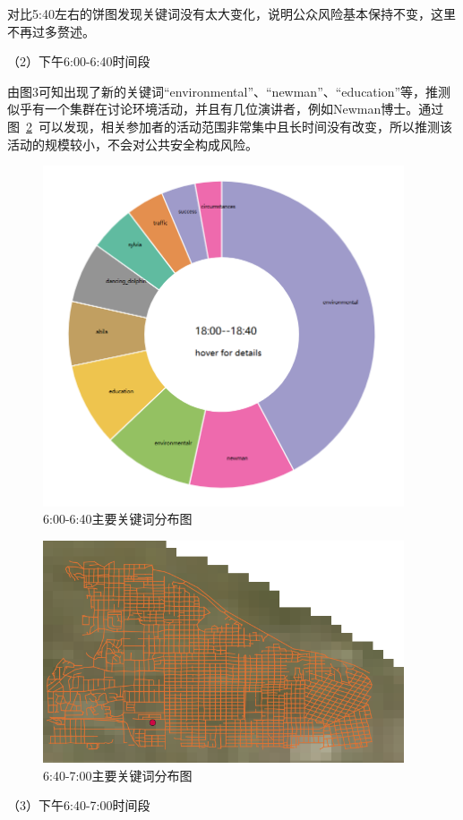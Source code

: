 \documentclass[a4paper]{article}
\begin{document}
对比5:40左右的饼图发现关键词没有太大变化，说明公众风险基本保持不变，这里不再过多赘述。

（2）下午6:00-6:40时间段

由图3可知出现了新的关键词“environmental”、“newman”、“education”等，推测似乎有一个集群在讨论环境活动，并且有几位演讲者，例如Newman博士。通过图~\ref{fig:2-4}~可以发现，相关参加者的活动范围非常集中且长时间没有改变，所以推测该活动的规模较小，不会对公共安全构成风险。

\begin{figure}[H]
  \centering
  \includegraphics[width=0.95\textwidth]{images/2-3.png}
  \caption{6:00-6:40主要关键词分布图}\label{fig:2-3}
  \vspace{\baselineskip}
\end{figure}

\begin{figure}[H]
  \centering
  \includegraphics[width=0.95\textwidth]{images/2-4.png}
  \caption{6:40-7:00主要关键词分布图}\label{fig:2-4}
  \vspace{\baselineskip}
\end{figure}
（3）下午6:40-7:00时间段
\end{document}
